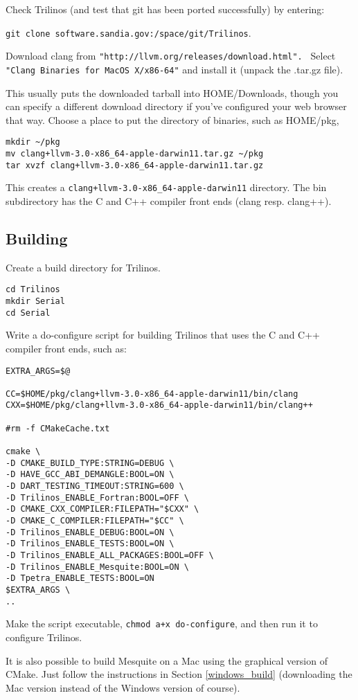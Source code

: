 Check Trilinos (and test that git has been ported successfully) by entering:

\begin{center}
 {\tt git clone software.sandia.gov:/space/git/Trilinos}.
\end{center}

Download clang from {\tt "http://llvm.org/releases/download.html". } Select {\tt "Clang Binaries for MacOS X/x86-64"} and install it (unpack the .tar.gz file).

This usually puts the downloaded tarball into HOME/Downloads, though you can specify a different download directory if you've configured your web browser that way.  Choose a place to put the directory of binaries, such as  HOME/pkg,
\begin{verbatim}
mkdir ~/pkg
mv clang+llvm-3.0-x86_64-apple-darwin11.tar.gz ~/pkg
tar xvzf clang+llvm-3.0-x86_64-apple-darwin11.tar.gz
\end{verbatim}
This creates a {\tt clang+llvm-3.0-x86\_64-apple-darwin11} directory.  
The bin subdirectory has the C and C++ compiler front ends (clang resp. clang++).
\subsection{Building}
Create a build directory for Trilinos.
\begin{verbatim}
cd Trilinos
mkdir Serial
cd Serial
\end{verbatim}
Write a do-configure script for building Trilinos that uses the C and C++ compiler front ends, such as:
\begin{verbatim}
EXTRA_ARGS=$@

CC=$HOME/pkg/clang+llvm-3.0-x86_64-apple-darwin11/bin/clang
CXX=$HOME/pkg/clang+llvm-3.0-x86_64-apple-darwin11/bin/clang++

#rm -f CMakeCache.txt

cmake \
-D CMAKE_BUILD_TYPE:STRING=DEBUG \
-D HAVE_GCC_ABI_DEMANGLE:BOOL=ON \
-D DART_TESTING_TIMEOUT:STRING=600 \
-D Trilinos_ENABLE_Fortran:BOOL=OFF \
-D CMAKE_CXX_COMPILER:FILEPATH="$CXX" \
-D CMAKE_C_COMPILER:FILEPATH="$CC" \
-D Trilinos_ENABLE_DEBUG:BOOL=ON \
-D Trilinos_ENABLE_TESTS:BOOL=ON \
-D Trilinos_ENABLE_ALL_PACKAGES:BOOL=OFF \
-D Trilinos_ENABLE_Mesquite:BOOL=ON \
-D Tpetra_ENABLE_TESTS:BOOL=ON 
$EXTRA_ARGS \
..
\end{verbatim}
Make the script executable, {\tt chmod a+x do-configure}, and then run it to configure Trilinos.

It is also possible to build Mesquite on a Mac using the graphical version of CMake. Just follow the instructions in Section \ref{windows_build} (downloading the Mac version instead of the Windows version of course).

